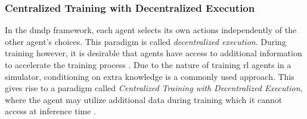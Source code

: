 \subsubsection{Centralized Training with Decentralized Execution}\label{sssec:central_plan_decentral_ex}
In the \gls{dmdp} framework, each agent selects its own actions independently of the other agent's choices. This paradigm is called \emph{decentralized execution}. During training however, it is desirable that agents have access to additional information to accelerate the training process \cite{loweMultiAgentActorCriticMixed2020}. Due to the nature of training \gls{rl} agents in a simulator, conditioning on extra knowledge  is a commonly used approach. This gives rise to a paradigm called \emph{Centralized Training with Decentralized Execution}, where the agent may utilize additional data during training which it cannot access at inference time \cite{foersterDeepMultiAgentReinforcement}.



